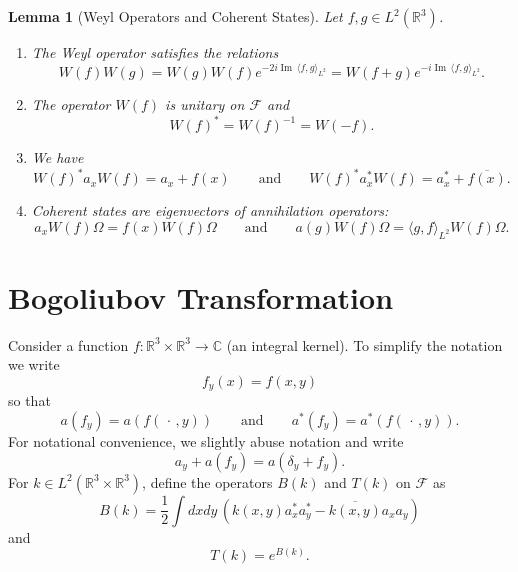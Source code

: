 \documentclass[11pt,a4paper,draft,DIV11]{scrartcl}	%
\newtheorem{lem}[thm]{Lemma}
\newcommand{\R}{\mathds{R}}
\newcommand{\N}{\mathcal{N}}
\newcommand{\Rbb}{\mathbb{R}}		%
\newcommand{\Cbb}{\mathbb{C}}		%
\renewcommand{\Im}{\operatorname{Im}\,} 	%
\newcommand{\be}[1]{\begin{equation}\label{eq:#1}}	%
\newcommand{\ee}{\end{equation}}
\begin{document}
\begin{lem}[Weyl Operators and Coherent States] \label{l:W}
  Let $f, g \in L^2(\R^3)$.
  \begin{enumerate}
    \item \label{l:W1} The Weyl operator satisfies the relations
      \[
        W(f) W(g) = W(g) W(f) e^{-2i \Im \langle f, g \rangle_{L^2}} = W(f+g)
        e^{-i \Im \langle f, g \rangle_{L^2}}.
      \]
    \item \label{l:W2} The operator $W(f)$ is unitary on $\mathcal{F}$ and
      \[
        W(f)^* = W(f)^{-1} = W(-f).
      \]
    \item \label{l:W3} We have
      \[
        W(f)^* a_x W(f) = a_x + f(x) \qquad \text{and} \qquad W(f)^* a_x^*
        W(f) = a_x^* + \overline{f(x)}.
      \]
    \item \label{l:W4} Coherent states are
      eigenvectors of annihilation operators:
      \[
        a_x W(f)\Omega = f(x) W(f)\Omega \qquad \text{and} \qquad a(g) W(f)\Omega
        = \langle g, f \rangle_{L^2} W(f)\Omega.
      \]
\iffalse    \item \label{l:W5} The expectation of the number of particles in the
      coherent state $\psi(f)$ is given by $\| f \|_{L^2}^2$, that is,
      \[
        \langle \psi(f), \N^2 \psi(f) \rangle = \| f \|_{L^2}^2.
      \]
      Also the variance of the number of particles in $\psi(f)$ is given by
      $\| f \|_{L^2}$ (the distribution of $\N$ is poisson), that is,
      \[
        \langle \psi(f), \N^2 \psi(f) \rangle - \langle \psi(f), \N \psi(f)
        \rangle^2 = \| f \|_{L^2}^2.
      \]
    \item \label{l:W6} Coherent states are normalized but not orthogonal to
      each other. In fact,
      \[
        \langle \psi(f), \psi(g) \rangle = e^{-\frac{1}{2} (\| f \|_{L^2}^2 +
        \| g \|_{L^2}^2 - 2 \langle f, g \rangle_{L^2} )} \qquad \text{so
        that} \qquad |\langle \psi(f), \psi(g) \rangle| = e^{-\frac{1}{2} \| f
        - g \|_{L^2}^2}.
      \]\fi
  \end{enumerate}
\end{lem}


\section{Bogoliubov Transformation}
Consider a function $f\colon \Rbb^3\times\Rbb^3 \to \Cbb$ (an integral kernel). To simplify the
notation we write
\be{no1}
  f_y(x) = f(x,y)
\ee
so that
\[
  a(f_y) = a(f(\,\cdot\,,y)) \qquad \text{and} \qquad a^*(f_y) =
  a^*(f(\,\cdot\,,y)).
\]
For notational convenience, we slightly abuse notation and write
\[
  a_y + a(f_y) = a(\delta_y + f_y).
\]
%
For $k \in L^2(\R^3 \times \R^3)$, define the operators $B(k)$ and $T(k)$ on
$\mathcal{F}$ as
\[
  B(k) = \frac{1}{2} \int dxdy \, (k(x,y) a_x^* a_y^* - \overline{k(x,y)} a_x
  a_y)
\]
and
\[
  T(k) = e^{B(k)}.
\]
\end{document}
